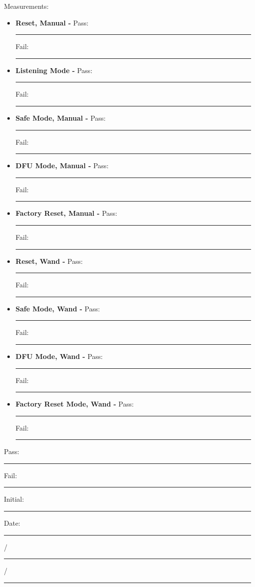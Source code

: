 {\Large Measurements: }\\
\begin{itemize}
\item \textbf{Reset, Manual - } \hfill Pass: \rule{1cm}{0.15mm} \hspace{1cm} Fail: \rule{1cm}{0.15mm}
\item \textbf{Listening Mode - } \hfill Pass: \rule{1cm}{0.15mm} \hspace{1cm} Fail: \rule{1cm}{0.15mm}
\item \textbf{Safe Mode, Manual - } \hfill Pass: \rule{1cm}{0.15mm} \hspace{1cm} Fail: \rule{1cm}{0.15mm}
\item \textbf{DFU Mode, Manual - } \hfill Pass: \rule{1cm}{0.15mm} \hspace{1cm} Fail: \rule{1cm}{0.15mm}
\item \textbf{Factory Reset, Manual - } \hfill Pass: \rule{1cm}{0.15mm} \hspace{1cm} Fail: \rule{1cm}{0.15mm}
\item \textbf{Reset, Wand - } \hfill Pass: \rule{1cm}{0.15mm} \hspace{1cm} Fail: \rule{1cm}{0.15mm}
\item \textbf{Safe Mode, Wand - } \hfill Pass: \rule{1cm}{0.15mm} \hspace{1cm} Fail: \rule{1cm}{0.15mm}
\item \textbf{DFU Mode, Wand - } \hfill Pass: \rule{1cm}{0.15mm} \hspace{1cm} Fail: \rule{1cm}{0.15mm}
\item \textbf{Factory Reset Mode, Wand - } \hfill Pass: \rule{1cm}{0.15mm} \hspace{1cm} Fail: \rule{1cm}{0.15mm}
\end{itemize}

\vfill
{\large Pass: \rule{1cm}{0.15mm} \hspace{1cm} Fail: \rule{1cm}{0.15mm}} \hfill Initial: \rule{2cm}{0.15mm} \hspace{1cm} Date: \rule{0.5cm}{0.15mm}/\rule{0.5cm}{0.15mm}/\rule{1cm}{0.15mm}\\[5pt]

